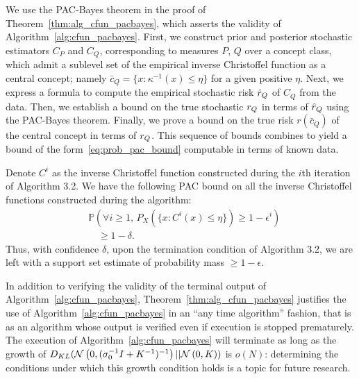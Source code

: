 \documentclass[onefignum,onetabnum]{siamart171218}
\begin{document}
We use the PAC-Bayes theorem in the proof of
Theorem~\ref{thm:alg_cfun_pacbayes}, 
which asserts the validity of
Algorithm~\ref{alg:cfun_pacbayes}.
First, we construct prior and
posterior stochastic estimators $C_P$ and $C_Q$, corresponding to measures $P$,
$Q$ over a concept class,
which admit a sublevel set of the empirical inverse Christoffel function as a
central concept; namely
$\bar{c}_Q=\{x:\kappa^{-1}(x) \le\eta\}$ for a given positive $\eta$. 
Next, we express a formula to compute the empirical stochastic risk $\hat{r}_{Q}$
of $C_Q$ from the data. 
Then, we establish a bound on the true stochastic $r_{Q}$ in terms of $\hat{r}_{Q}$ using the PAC-Bayes theorem.
Finally, we prove a bound on the true risk $r(\bar{c}_Q)$ of the central concept
in terms of $r_{Q}$. This sequence of bounds combines to yield
a bound of the
form~\eqref{eq:prob_pac_bound} computable in terms of known data. 

\begin{theorem}
    \label{thm:alg_cfun_pacbayes}
    Denote $C^i$ as the inverse Christoffel function constructed during the $i$th
    iteration of Algorithm 3.2. We have the following PAC bound on all the inverse
    Christoffel functions constructed during the algorithm:
    \begin{equation*}
        \begin{aligned}
        \label{eq:pac_epsi}
        &\mathbb P(\forall i\geq1,\, P_X(\{x:C^i(x) \leq\eta\}) \geq 1-\epsilon^i)\\
        &\quad \geq 1-\delta.
        \end{aligned}
    \end{equation*}
    Thus, with confidence $\delta$, upon the termination condition of Algorithm
    3.2, we are left with a support set estimate of probability mass $\geq 1- \epsilon$.
\end{theorem}

In addition to verifying the validity of the terminal output of
Algorithm~\ref{alg:cfun_pacbayes}, Theorem~\ref{thm:alg_cfun_pacbayes} justifies
the use of Algorithm~\ref{alg:cfun_pacbayes} in an ``any time algorithm''
fashion, that is as an algorithm whose output is verified even if execution is
stopped prematurely. The execution of Algorithm~\ref{alg:cfun_pacbayes} will terminate as long as the growth of 
$D_{KL}(\mathcal{N}\left(0, (\sigma_0^{-1}I + K^{-1})^{-1}\right)||\mathcal{N}\left(0,K\right))$ is $o(N)$:
determining the conditions under which this growth condition holds is a topic
for future research.
 
\end{document}
